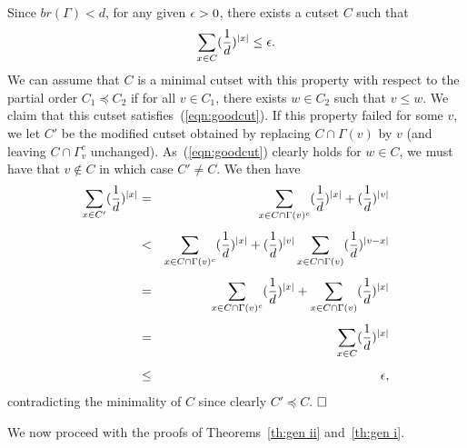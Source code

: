 Since $\textstyle {br} (\Gamma) < d$, for any given $\epsilon >0$, there exists 
a cutset $C$ such that
$$
\sum_{x\in C}({1 \over d})^{|x|} \le \epsilon.
$$
We can assume that $C$ is a minimal cutset with this property with respect
to the partial order $C_1 \preceq C_2$ if for all $v\in C_1$, there exists
$w\in C_2$ such that $v\le w$. We claim that this cutset
satisfies~(\ref{eqn:goodcut}). If this property failed for some $v$,
we let $C'$ be the modified cutset obtained by replacing $C\cap \Gamma (v)$
by $v$ (and leaving $C\cap \Gamma^c_v$ unchanged).
As~(\ref{eqn:goodcut}) clearly holds for $w\in C$, we must
have that $v\not\in C$ in which case $C'\neq C$.
We then have
\begin{eqnarray*}
\sum_{x\in C'}({1 \over d})^{|x|} & = & 
   \sum_{x\in C\cap \Gamma (v)^c}({1 \over d})^{|x|}+({1 \over d})^{|v|} \\[1ex]
& < & \sum_{x\in C\cap \Gamma (v)^c}({1 \over d})^{|x|}+
   ({1 \over d})^{|v|} \sum_{x\in C\cap \Gamma (v)}({1 \over d})^{|v-x|} \\[1ex]
& = & \sum_{x\in C\cap \Gamma (v)^c}({1 \over d})^{|x|}+
   \sum_{x\in C\cap \Gamma (v)}({1 \over d})^{|x|} \\[1ex]
& = & \sum_{x\in C}({1 \over d})^{|x|} \\[1ex]
& \le & \epsilon,
\end{eqnarray*}
contradicting the minimality of $C$ since clearly $C'\preceq C$.
$\qed$

We now proceed with the proofs of Theorems~\ref{th:gen ii} and~\ref{th:gen i}.

